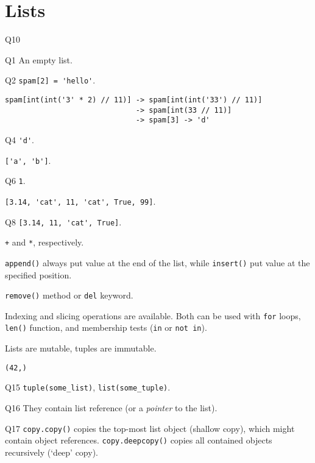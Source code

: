 \documentclass[a4paper,11pt]{scrartcl}
\begin{document}
\newpage
\setcounter{section}{3}
\section{Lists}

\begin{labeling}{Q10}
  \item[Q1]
  An empty list.

  \item[Q2]
  \lstinline{spam[2] = 'hello'}.

  \item[Q3]
  \begin{lstlisting}
spam[int(int('3' * 2) // 11)] -> spam[int(int('33') // 11)]
                              -> spam[int(33 // 11)]
                              -> spam[3] -> 'd'
  \end{lstlisting}

  \item[Q4]
  \lstinline{'d'}.

  \item[Q5]
  \lstinline{['a', 'b']}.

  \item[Q6]
  \lstinline{1}.

  \item[Q7]
  \lstinline{[3.14, 'cat', 11, 'cat', True, 99]}.

  \item[Q8]
  \lstinline{[3.14, 11, 'cat', True]}.

  \item[Q9]
  \lstinline{+} and \lstinline{*}, respectively.

  \item[Q10]
  \lstinline{append()} always put value at the end of the list, while \lstinline{insert()} put value at the specified position.

  \item[Q11]
  \lstinline{remove()} method or \lstinline{del} keyword.

  \item[Q12]
  Indexing and slicing operations are available. Both can be used with \lstinline{for} loops, \lstinline{len()} function, and membership tests (\lstinline{in} or \lstinline{not in}).

  \item[Q13]
  Lists are mutable, tuples are immutable.

  \item[Q14]
  \lstinline{(42,)}

  \item[Q15]
  \lstinline{tuple(some_list)}, \lstinline{list(some_tuple)}.

  \item[Q16]
  They contain list reference (or a \emph{pointer} to the list).

  \item[Q17]
  \lstinline{copy.copy()} copies the top-most list object (shallow copy), which might contain object references. \lstinline{copy.deepcopy()} copies all contained objects recursively (`deep' copy).

\end{labeling}
\end{document}
